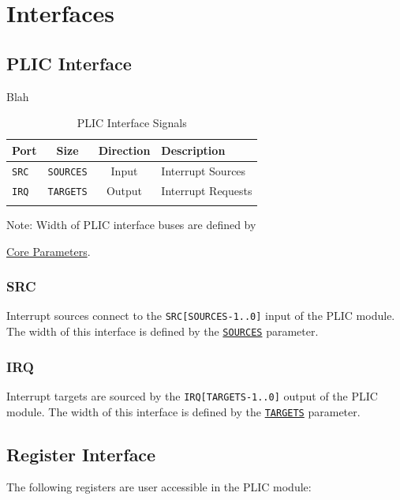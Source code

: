 \section{Interfaces}



\subsection{PLIC Interface}

Blah

\begin{longtable}[c]{@{\extracolsep{\fill}}lccl@{\extracolsep{\fill}}}	
	\toprule
	\textbf{Port} & \textbf{Size} & \textbf{Direction} & \textbf{Description}\\
	\midrule 
	\endhead
	\texttt{SRC} & \texttt{SOURCES} & Input & Interrupt Sources\\
	\texttt{IRQ} & \texttt{TARGETS} & Output & Interrupt Requests \\
	\bottomrule 	
	\caption{PLIC Interface Signals}
	\label{tab:PLICIF2}

\end{longtable}


Note: Width of PLIC interface buses are defined by

\protect\hyperlink{core-parameters}{Core Parameters}.

\subsubsection{SRC}

Interrupt sources connect to the \texttt{SRC{[}SOURCES-1..0{]}} input of
the PLIC module. The width of this interface is defined by the
\protect\hyperlink{SOURCES}{\texttt{SOURCES}} parameter.

\subsubsection{IRQ}

Interrupt targets are sourced by the \texttt{IRQ{[}TARGETS-1..0{]}}
output of the PLIC module. The width of this interface is defined by the
\protect\hyperlink{TARGETS}{\texttt{TARGETS}} parameter.

\subsection{Register Interface}

The following registers are user accessible in the PLIC module:

